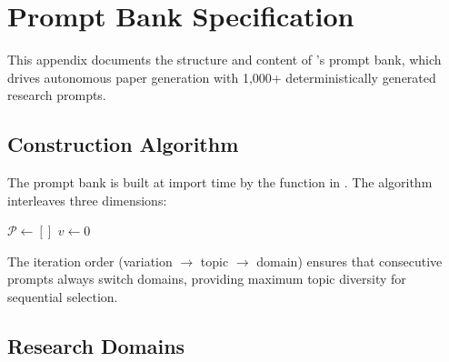 \chapter{Prompt Bank Specification}
\label{app:prompt-bank}

This appendix documents the structure and content of \autoscholar's prompt bank, which drives autonomous paper generation with 1,000+ deterministically generated research prompts.

\section{Construction Algorithm}
\label{sec:prompts:algorithm}

The prompt bank is built at import time by the function  in .
The algorithm interleaves three dimensions:

\begin{algorithm}[H]
\caption{Prompt Bank Construction}
\label{alg:prompt-bank}
\SetAlgoLined
{}

$\mathcal{P} \gets []$\;
$v \gets 0$\; 
\;
\end{algorithm}

The iteration order (variation $\to$ topic $\to$ domain) ensures that consecutive prompts always switch domains, providing maximum topic diversity for sequential selection.

\section{Research Domains}
\label{sec:prompts:domains}

